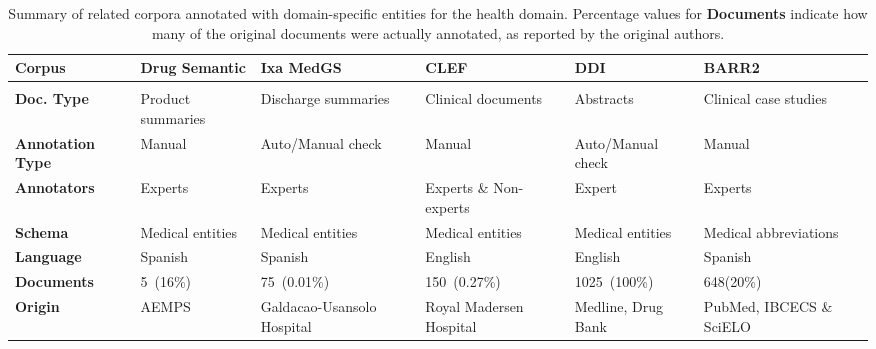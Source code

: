   \begin{table}[h!]\centering
    \footnotesize{
    \begin{tabularx}{\hsize}{X|XXXXX}
        \hline
        \hline
      \textbf{Corpus} & \textbf{Drug Semantic} & \textbf{Ixa MedGS} & \textbf{CLEF} & \textbf{DDI} & {\textbf{BARR2}} \\
        \hline \\
      \textbf{Doc. Type} & Product summaries & Discharge summaries & Clinical documents & Abstracts & Clinical case studies \\
        \textbf{Annotation Type} & Manual & Auto/Manual check & Manual &  Auto/Manual check & Manual \\
        \textbf{Annotators} & Experts & Experts & Experts \& Non-experts & Expert & Experts \\
        \textbf{Schema} & Medical entities & Medical entities & Medical entities & Medical entities & Medical abbreviations \\
        \textbf{Language} & Spanish & Spanish & English & English & Spanish \\
        \textbf{Documents} & 5~(16\%) & 75~(0.01\%) & 150~(0.27\%) & 1025~(100\%) & 648(20\%) \\
        \textbf{Origin} & AEMPS & Galdacao-Usansolo Hospital & Royal Madersen Hospital & Medline, Drug Bank & PubMed, IBCECS \& SciELO \\
        \hline
        \hline
    \end{tabularx}
    } %
    \caption{Summary of related corpora annotated with domain-specific entities for the health domain.
            {Percentage values for \textbf{Documents} indicate how many of the original documents were actually annotated, as reported by the original authors.} %
            \label{tab:stateofart}}
    \end{table}


